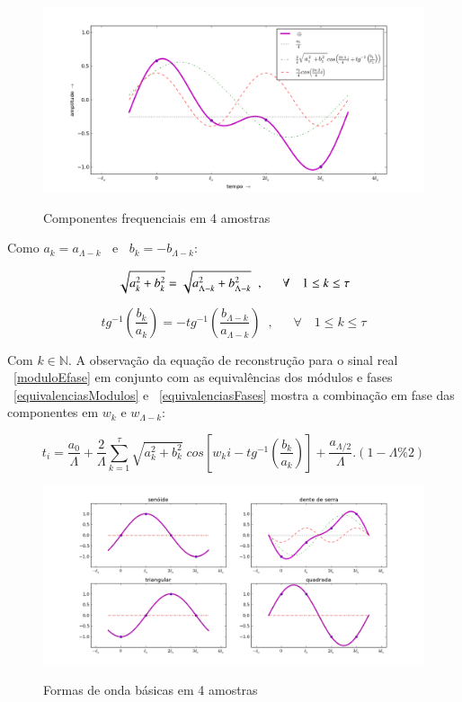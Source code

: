 \begin{figure}[h!]
    \centering
    \caption{Componentes frequenciais em 4 amostras}
        \includegraphics[width=\textwidth]{figuras/amostras4__}
        \label{fig:amostras4}
\end{figure}


Como $a_k = a_{\Lambda -k}\;\;$ e $\;\;b_k = - b_{\Lambda -k}$:

\begin{equation}\label{equivalenciasModulos}
\sqrt{a_k^2 + b_k^2} = \sqrt{a_{\Lambda - k}^2 + b_{\Lambda -k}^2} \;\;, \quad \;\; \forall \quad 1 \leq k \leq \tau  \\
\end{equation}

\begin{equation}\label{equivalenciasFases}
tg^{-1}\left(\frac{b_k}{a_k}\right)=-tg^{-1}\left(\frac{b_{\Lambda -k}}{a_{\Lambda - k}}\right)\;\;,\quad \;\; \forall \quad 1 \leq k \leq \tau
\end{equation}


Com $k \in \mathbb{N}$. A observação da equação de reconstrução para o sinal real ~\ref{moduloEfase} em conjunto com as equivalências dos módulos e fases ~\ref{equivalenciasModulos} e ~\ref{equivalenciasFases}
mostra a combinação em fase das componentes em $w_k$ e $w_{\Lambda-k}$:

\begin{equation}
t_i = \frac{a_0}{\Lambda} + \frac{2}{\Lambda}\sum_{k=1}^{\tau}\sqrt{a_k^2 + b_k^2} \; cos\left[w_k i - tg^{-1}\left(\frac{b_k}{a_k}\right)\right]+ \frac{ a_{\Lambda/2}}{\Lambda}.(1-\Lambda\% 2)
\end{equation}

\begin{figure}[h!]
    \centering
    \caption{Formas de onda básicas em 4 amostras}
        \includegraphics[width=\textwidth]{figuras/amostras4formas__}
        \label{fig:formas4}
\end{figure}


